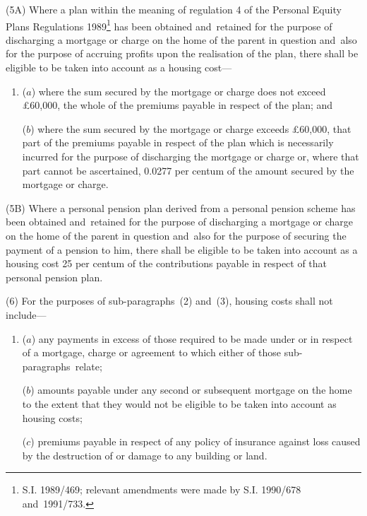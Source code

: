 \documentclass[12pt,a4paper]{article}
\begin{document}
(5A) Where a plan within the meaning of regulation 4 of the Personal Equity Plans Regulations 1989\footnote{\frenchspacing S.I. 1989/469; relevant amendments were made by S.I. 1990/678 and~1991/733.} has been obtained and~retained for the purpose of discharging a mortgage or charge on the home of the parent in question and~also for the purpose of accruing profits upon the realisation of the plan, there shall be eligible to be taken into account as a housing cost—
\begin{enumerate}\item[]
($a$) where the sum secured by the mortgage or charge does not exceed £60,000, the whole of the premiums payable in respect of the plan; and

($b$) where the sum secured by the mortgage or charge exceeds £60,000, that part of the premiums payable in respect of the plan which is necessarily incurred for the purpose of discharging the mortgage or charge or, where that part cannot be ascertained, 0$.$0277 per centum of the amount secured by the mortgage or charge.
\end{enumerate}

(5B) Where a personal pension plan 
derived from a personal pension scheme  %
has been obtained and~retained for the purpose of discharging a mortgage or charge on the home of the parent in question and~also for the purpose of securing the payment of a pension to him, there shall be eligible to be taken into account as a housing cost 25 per centum of the contributions payable in respect of that personal pension plan.

(6) For the purposes of sub-paragraphs~(2) and~(3), housing costs shall not include—
\begin{enumerate}\item[]
($a$) 
any payments in excess of those required  %
to be made under or in respect of a mortgage, charge or agreement to which either of those sub-paragraphs~relate;

($b$) 
amounts payable  %
under any second or subsequent mortgage on the home to the extent that 
they would not be eligible  %
to be taken into account as housing costs;

($c$) premiums payable in respect of any policy of insurance against loss caused by the destruction of or damage to any building or land.
\end{enumerate}
\end{document}
